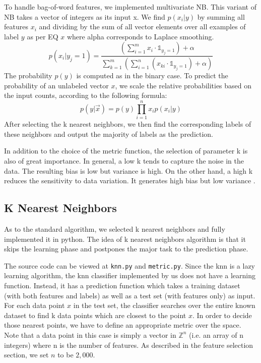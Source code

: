 \documentclass{acm_proc_article-sp}
\begin{document}
To handle bag-of-word features, we implemented multivariate NB. This variant of NB takes a vector of integers as its input x. We find $p(x_i|y)$ by summing all features $x_i$ and dividing by the sum of all vector elements over all examples of label $y$ as per EQ $x$ where alpha corresponds to Laplace smoothing.
\begin{equation}
p(x_i | y_j =1) = \frac{(\sum_{i=1}^m x_i \cdot \mathds{1}_{y_j=1} ) + \alpha }{\sum_{k=1}^m(\sum_{i=1}^n (x_{ki}\cdot \mathds{1}_{y_j=1})+\alpha)} \label{eq:nb5}
\end{equation}
The probability $p(y)$ is computed as in the binary case. To predict the probability of an unlabeled vector $x$, we scale the relative probabilities based on the input counts, according to the following formula:
\begin{equation}
p(y | \overrightarrow{x}) = p(y) \prod_{i=1}^n x_i p(x_i | y) \label{eq:nb6}
\end{equation}
After selecting the k nearest neighbors, we then find the corresponding labels of these neighbors and output the majority of labels as the prediction.

In addition to the choice of the metric function, the selection of parameter k is also of great importance. In general, a low k tends to capture the noise in the data. The resulting bias is low but variance is high. On the other hand, a high k reduces the sensitivity to data variation. It generates high bias but low variance \cite{pineaul9}. 


\subsection{K Nearest Neighbors}
As to the standard algorithm, we selected k nearest neighbors and fully implemented it in python. The idea of k nearest neighbors algorithm is that it skips the learning phase and postpones the major task to the prediction phase.

The source code can be viewed at \texttt{knn.py} and \texttt{metric.py}. Since the knn is a lazy learning algorithm, the knn classifier implemented by us does not have a learning function. Instead, it has a prediction function which takes a training dataset (with both features and labels) as well as a test set (with features only) as input. For each data point $x$ in the test set, the classifier searches over the entire known dataset to find k data points which are closest to the point $x$. In order to decide those nearest points, we have to define an appropriate metric over the space. Note that a data point in this case is simply a vector in $\mathbb{Z}^n$ (i.e. an array of n integers) where n is the number of features. As described in the feature selection section, we set $n$ to be $2,000$. 
\end{document}
